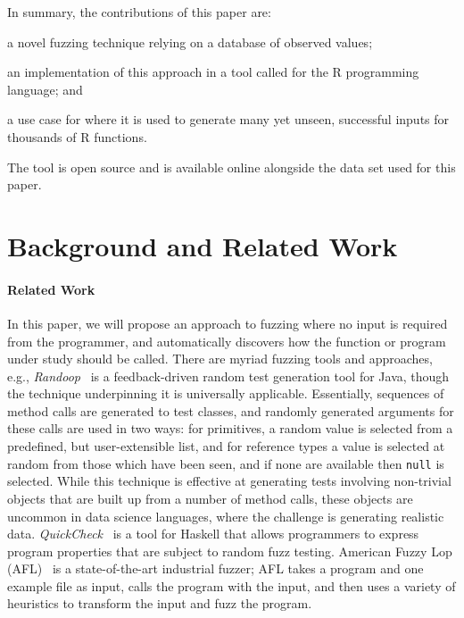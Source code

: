 \documentclass[sigplan,anonymous,review]{acmart}
\begin{document}


In summary, the contributions of this paper are:
%
\begin{inparaenum}[(1)]
    \item a novel fuzzing technique relying on a database of observed values;
    \item an implementation of this approach in a tool called \tool for the R programming language; and
    \item a use case for \tool where it is used to generate many yet unseen, successful inputs for thousands of R functions.
\end{inparaenum} 

The tool is open source and is available online alongside the data set used for this paper.

\section{Background and Related Work}
\label{sec:background}

\paragraph{Related Work}

In this paper, we will propose an approach to fuzzing where no input is required from the programmer, and automatically discovers how the function or program under study should be called.
There are myriad fuzzing tools and approaches, e.g., \emph{Randoop}~\cite{pacheco2007randoop} is a feedback-driven random test generation tool for Java, though the technique underpinning it is universally applicable.
Essentially, sequences of method calls are generated to test classes, and randomly generated arguments for these calls are used in two ways: for primitives, a random value is selected from a predefined, but user-extensible list, and for reference types a value is selected at random from those which have been seen, and if none are available then {\tt null} is selected.
While this technique is effective at generating tests involving non-trivial objects that are built up from a number of method calls, these objects are uncommon in data science languages, where the challenge is generating realistic data.
\emph{QuickCheck}~\cite{quickcheck} is a tool for Haskell that allows programmers to express program properties that are subject to random fuzz testing.
American Fuzzy Lop (AFL)~\cite{afl} is a state-of-the-art industrial fuzzer; AFL takes a program and one example file as input, calls the program with the input, and then uses a variety of heuristics to transform the input and fuzz the program.
\end{document}
